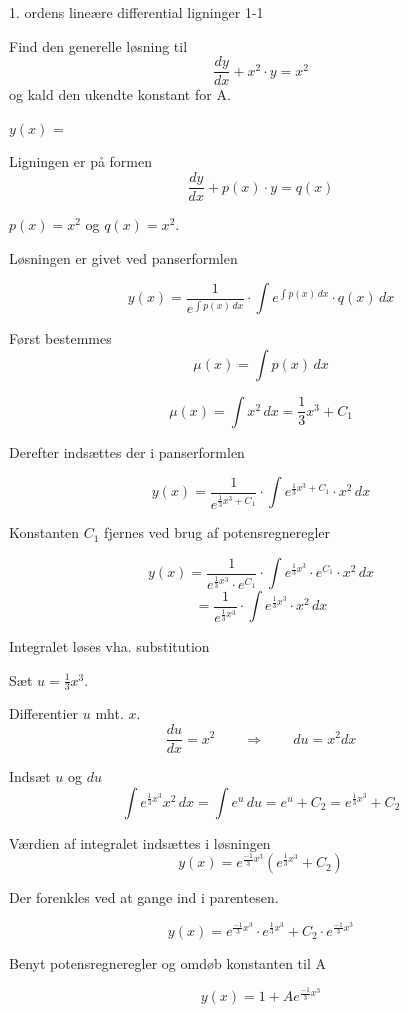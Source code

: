 \documentclass{article}
\begin{document}
\tableofcontents
\newpage

\begin{exercise}{1. ordens lineære differential ligninger 1-1}


Find den generelle løsning til
\[
\frac{dy}{dx} + x^2 \cdot y = x^2
\]
og kald den ukendte konstant for A.

$y(x)$ =  



\hint

Ligningen er på formen
\[
\frac{dy}{dx} + p(x) \cdot y = q(x)
\]

\hint

$p(x)=x^2$ og $q(x)=x^2$.

\hint

Løsningen er givet ved panserformlen


\hint

\[
y(x) = \frac{1}{e^{\int p(x) \, dx}} \cdot \int e^{\int p(x) \, dx}  \cdot q(x) \, dx
\]

\hint

Først bestemmes 
\[
\mu(x) = \int p(x) \, dx
\]

\hint
\[
\mu(x) = \int x^2 \, dx = \frac{1}{3} x^3 + C_1
\]

\hint
Derefter indsættes der i  panserformlen

\hint

\[
y(x) = \frac{1}{e^{\frac{1}{3}x^3 + C_1}} \cdot \int e^{\frac{1}{3}x^3 + C_1}  \cdot x^2 \, dx
\]


\hint

Konstanten $C_1$ fjernes ved brug af potensregneregler

\hint
\[
y(x) = \frac{1}{e^{\frac{1}{3}x^3} \cdot e^{C_1}} \cdot \int e^{\frac{1}{3}x^3} \cdot e^{C_1}  \cdot x^2 \, dx  
\]
\[
   = \frac{1}{e^{\frac{1}{3}x^3}} \cdot \int e^{\frac{1}{3}x^3}  \cdot x^2 \, dx
\]

\hint

Integralet løses vha. substitution


\hint
Sæt $u = \frac{1}{3}x^3$.

\hint

Differentier $u$ mht. $x$.
\[
\frac{du}{dx} = x^2 \qquad	\Rightarrow \qquad du = x^2 dx
\]

\hint 
Indsæt $u$ og $du$
\[
\int e^{\frac{1}{3}x^3}x^2 \, dx = \int e^{u} \, du = e^{u} + C_2 = e^{\frac{1}{3}x^3} + C_2
\]

\hint

Værdien af integralet indsættes i løsningen
\[
y(x) = e^{\frac{-1}{3}x^3} \left( e^{\frac{1}{3}x^3}+ C_2\right)
\]

\hint

Der forenkles ved at gange ind i parentesen.

\hint
\[
y(x) = e^{\frac{-1}{3}x^3} \cdot e^{\frac{1}{3}x^3} + C_2 \cdot e^{\frac{-1}{3}x^3} 
\]

\hint

Benyt potensregneregler og omdøb konstanten til A

\hint
\[
y(x) = 1 + A e^{\frac{-1}{3}x^3}
\]


\end{exercise}
\end{document}
